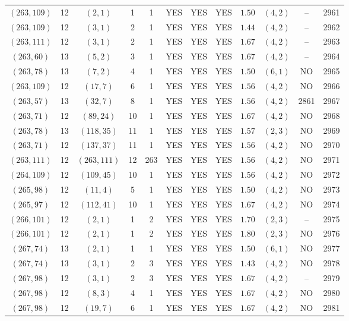 \begin{longtable}{|c|c|c|c|c|c|c|c|c|c|c|c|}
$(263,109)$ & 12 & $(2,1)$ & 1 & 1 & YES & YES & YES & $1.50$ & $(4,2)$ & -- & 2961\\
$(263,109)$ & 12 & $(3,1)$ & 2 & 1 & YES & YES & YES & $1.44$ & $(4,2)$ & -- & 2962\\
$(263,111)$ & 12 & $(3,1)$ & 2 & 1 & YES & YES & YES & $1.67$ & $(4,2)$ & -- & 2963\\
$(263,60)$ & 13 & $(5,2)$ & 3 & 1 & YES & YES & YES & $1.67$ & $(4,2)$ & -- & 2964\\
$(263,78)$ & 13 & $(7,2)$ & 4 & 1 & YES & YES & YES & $1.50$ & $(6,1)$ & NO & 2965\\
$(263,109)$ & 12 & $(17,7)$ & 6 & 1 & YES & YES & YES & $1.56$ & $(4,2)$ & NO & 2966\\
$(263,57)$ & 13 & $(32,7)$ & 8 & 1 & YES & YES & YES & $1.56$ & $(4,2)$ & 2861 & 2967\\
$(263,71)$ & 12 & $(89,24)$ & 10 & 1 & YES & YES & YES & $1.67$ & $(4,2)$ & NO & 2968\\
$(263,78)$ & 13 & $(118,35)$ & 11 & 1 & YES & YES & YES & $1.57$ & $(2,3)$ & NO & 2969\\
$(263,71)$ & 12 & $(137,37)$ & 11 & 1 & YES & YES & YES & $1.56$ & $(4,2)$ & NO & 2970\\
$(263,111)$ & 12 & $(263,111)$ & 12 & 263 & YES & YES & YES & $1.56$ & $(4,2)$ & NO & 2971\\
$(264,109)$ & 12 & $(109,45)$ & 10 & 1 & YES & YES & YES & $1.56$ & $(4,2)$ & NO & 2972\\
$(265,98)$ & 12 & $(11,4)$ & 5 & 1 & YES & YES & YES & $1.50$ & $(4,2)$ & NO & 2973\\
$(265,97)$ & 12 & $(112,41)$ & 10 & 1 & YES & YES & YES & $1.67$ & $(4,2)$ & NO & 2974\\
$(266,101)$ & 12 & $(2,1)$ & 1 & 2 & YES & YES & YES & $1.70$ & $(2,3)$ & -- & 2975\\
$(266,101)$ & 12 & $(2,1)$ & 1 & 2 & YES & YES & YES & $1.80$ & $(2,3)$ & NO & 2976\\
$(267,74)$ & 13 & $(2,1)$ & 1 & 1 & YES & YES & YES & $1.50$ & $(6,1)$ & NO & 2977\\
$(267,74)$ & 13 & $(3,1)$ & 2 & 3 & YES & YES & YES & $1.43$ & $(4,2)$ & NO & 2978\\
$(267,98)$ & 12 & $(3,1)$ & 2 & 3 & YES & YES & YES & $1.67$ & $(4,2)$ & -- & 2979\\
$(267,98)$ & 12 & $(8,3)$ & 4 & 1 & YES & YES & YES & $1.67$ & $(4,2)$ & NO & 2980\\
$(267,98)$ & 12 & $(19,7)$ & 6 & 1 & YES & YES & YES & $1.67$ & $(4,2)$ & NO & 2981\\

\end{longtable}
